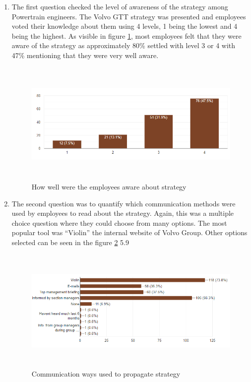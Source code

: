 \begin{enumerate}
    \item The first question checked the level of awareness of the strategy among Powertrain engineers. The Volvo GTT strategy was presented and employees voted their knowledge about them using 4 levels, 1 being the lowest and 4 being the highest. As visible in figure \ref{fig:5.8}, most employees felt that they were aware of the strategy as approximately 80\% settled with level 3 or 4 with 47\% mentioning that they were very well aware.
\begin{figure}[H]
    \centering
    \captionsetup{justification=centering, margin=2cm}
    \vspace{1cm}
    \includegraphics[width=12cm, height=6cm]{figure/auxiliary/fig58.PNG}
    \caption{How well were the employees aware about strategy}
    \label{fig:5.8}
\end{figure}    
    \item The second question was to quantify which communication methods were used by employees to read about the strategy. Again, this was a multiple choice question where they could choose from many options. The most popular tool was “Violin” the internal website of Volvo Group. Other options selected can be seen in the figure \ref{fig:5.9} 5.9 

\begin{figure}[H]
    \centering
    \captionsetup{justification=centering, margin=2cm}
    \vspace{1cm}
    \includegraphics[width=14cm, height=6cm]{figure/auxiliary/fig59.PNG}
    \caption{ Communication ways used to propagate strategy}
    \label{fig:5.9}
\end{figure}


\end{enumerate}
